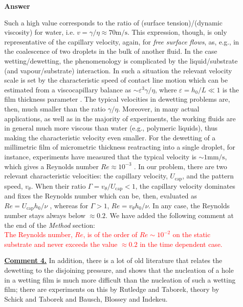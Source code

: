 \documentclass[12pt,english]{article}
\begin{document}
\begin{itemize}
\item[ \textbf{{Answer}}]
{
Such a high value corresponds to the ratio of (surface tension)/(dynamic viscosity) for water, i.e. $v = \gamma/\eta \approx 70 \mbox{m}/\mbox{s}$.
This expression, though, is only representative of the capillary velocity, again, for {\it free surface flows}, as, e.g., in the coalescence of 
two droplets in the bulk of another fluid. 
In the case wetting/dewetting, 
the phenomenology is complicated by the liquid/substrate (and vapour/substrate) interaction. 
In such a situation the relevant velocity scale is set by the characteristic speed of contact line 
motion which can be estimated from a viscocapillary balance as 
$\sim \varepsilon^3 \gamma/\eta$, where $\varepsilon = h_0/L \ll 1$ is the film thickness parameter 
\cite{RevModPhys.69.931,doi:10.1146/annurev-fluid-011212-140734}. 
The typical velocities in dewetting problems are, then, much smaller than the ratio $\gamma/\eta$.
Moreover, in many actual applications, as well as in the majority of experiments, the 
working fluids are in general much more viscous than water (e.g., polymeric liquids), thus making
the characteristic velocity even smaller.
For the dewetting of a millimetric film of micrometric thickness reatracting into a single droplet, for instance, experiments have measured that 
the typical velocity is $\sim 1 \mbox{mm}/\mbox{s}$, which gives a Reynolds number $Re \approx 10^{-3}$ \cite{Edwards2016}. 
In our problem, there are two relevant characteristic velocities: the capillary velocity, $U_{\text{cap}}$, and 
the pattern speed, $v_{\theta}$. When their ratio $\Gamma = v_{\theta}/U_{\text{cap}} < 1$, the capillary 
velocity dominates and fixes the Reynolds number which can be, then, evaluated as 
$Re = U_{\text{cap}}h_0/\nu$ \cite{RevModPhys.69.931}, whereas for $\Gamma > 1$, $Re = v_{\theta} h_0/\nu$. 
In any case, the Reynolds number stays always below $\approx 0.2$.
We have added the following comment at the end of the {\it Method} section:\\

\textcolor{red}{The Reynolds number, $Re$, is of the order of $Re \sim 10^{-2}$ on the 
static substrate and never exceeds the value $\approx 0.2$ in the time dependent case.}

}

\item[ \textbf{\underline{Comment 4.}}]
{ 
In addition, there is a lot of old literature that relates the dewetting to the disjoining pressure, and shows that the nucleation of a hole in a wetting film is much more difficult than the nucleation of such a wetting film; there are experiments on this by Rutledge and Taborek, theory by Schick and Taborek and Bausch, Blossey and Indekeu.
}


\end{itemize}
\end{document}
